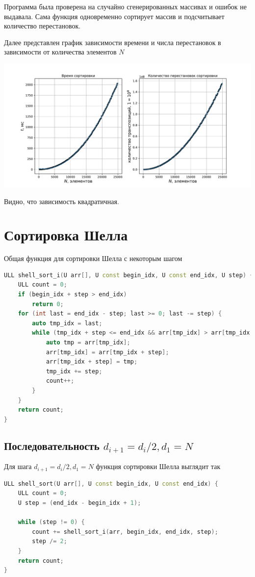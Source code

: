 \documentclass[a4paper,12pt]{article}
\begin{document}
Программа была проверена на случайно сгенерированных массивах и ошибок не выдавала.
Сама функция одновременно сортирует массив и подсчитывает количество перестановок.

Далее представлен график зависимости времени и числа перестановок в зависимости от количества элементов $N$

\begin{center}
\includegraphics[scale=0.6]{Figure_1.pdf}
\end{center}

Видно, что зависимость квадратичная.

\section*{Сортировка Шелла}
Общая функция для сортировки Шелла с некоторым шагом
\begin{lstlisting}[language=C++]
ULL shell_sort_i(U arr[], U const begin_idx, U const end_idx, U step) {
    ULL count = 0;
    if (begin_idx + step > end_idx)
        return 0;
    for (int last = end_idx - step; last >= 0; last -= step) {
        auto tmp_idx = last;
        while (tmp_idx + step <= end_idx && arr[tmp_idx] > arr[tmp_idx + step]) {
            auto tmp = arr[tmp_idx];
            arr[tmp_idx] = arr[tmp_idx + step];
            arr[tmp_idx + step] = tmp;
            tmp_idx += step;
            count++;
        }
    }
    return count;
}
\end{lstlisting}

\subsection*{Последовательность $d_{i+1} = d_i / 2, d_1 = N$}
Для шага $d_{i+1} = d_i / 2, d_1 = N$ функция сортировки Шелла выглядит так
\begin{lstlisting}[language=C++]
ULL shell_sort(U arr[], U const begin_idx, U const end_idx) {
    ULL count = 0;
    U step = (end_idx - begin_idx + 1);

    while (step != 0) {
        count += shell_sort_i(arr, begin_idx, end_idx, step);
        step /= 2;
    }
    return count;
}
\end{lstlisting}
\end{document}
